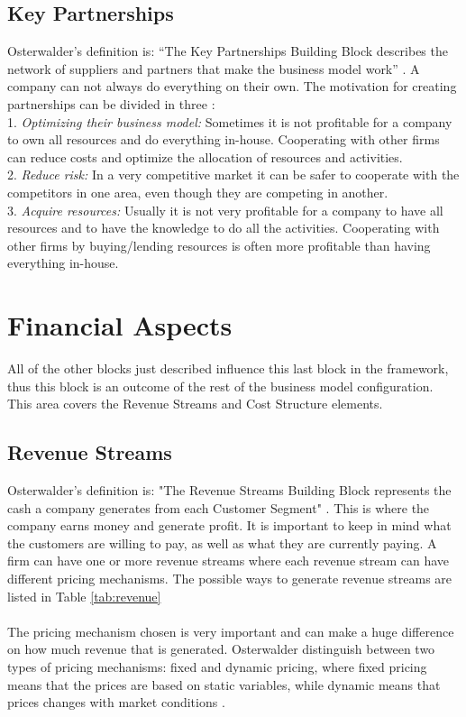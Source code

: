 \subsection{Key Partnerships}
Osterwalder’s definition is: “The Key Partnerships Building Block describes the network of suppliers and partners that make the business model work” \cite{osterwalder}. A company can not always do everything on their own. The motivation for creating partnerships can be divided in three \cite{osterwalder}: 
\\
1. \emph{Optimizing their business model:} Sometimes it is not profitable for a company to own all resources and do everything in-house. Cooperating with other firms can reduce costs and optimize the allocation of resources and activities. 
\\
2. \emph{Reduce risk:} In a very competitive market it can be safer to cooperate with the competitors in one area, even though they are competing in another.
\\
3. \emph{Acquire resources:} Usually it is not very profitable for a company to have all resources and to have the knowledge to do all the activities. Cooperating with other firms by buying/lending resources is often more profitable than having everything in-house. 

\section{Financial Aspects}
All of the other blocks just described influence this last block in the framework, thus this block is an outcome of the rest of the business model configuration. This area covers the Revenue Streams and Cost Structure elements. \cite{osterwalderthesis}

\subsection{Revenue Streams}
Osterwalder’s definition is: "The Revenue Streams Building Block represents the cash a company generates from each Customer Segment" \cite{osterwalder}. This is where the company earns money and generate profit. It is important to keep in mind what the customers are willing to pay, as well as what they are currently paying. A firm can have one or more revenue streams where each revenue stream can have different pricing mechanisms.  The possible ways to generate revenue streams are listed in Table \ref{tab:revenue}  \\ \\ 
The pricing mechanism chosen is very important and can make a huge difference on how much revenue that is generated. Osterwalder distinguish between two types of pricing mechanisms: fixed and dynamic pricing, where fixed pricing means that the prices are based on static variables, while dynamic means that prices changes with market conditions \cite{osterwalder}.

